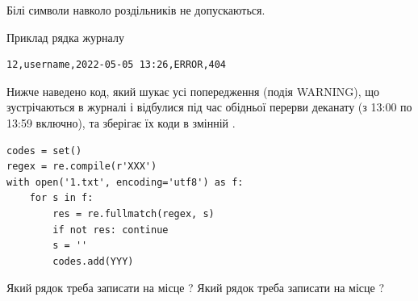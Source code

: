 \documentclass[12pt, ukrainian]{article}
\begin{document}
{Білі символи навколо роздільників не допускаються.

Приклад рядка журналу



\begin{verbatim}
12,username,2022-05-05 13:26,ERROR,404
\end{verbatim}


Нижче наведено код, який шукає усі попередження (подія WARNING), що зустрі\-ча\-ються в журналі і відбулися під час обідньої перерви деканату (з 13:00 по 13:59 включно), та зберігає їх коди в змінній .



\begin{verbatim}
codes = set()
regex = re.compile(r'XXX')
with open('1.txt', encoding='utf8') as f:
    for s in f:
        res = re.fullmatch(regex, s)
        if not res: continue
        s = ''
        codes.add(YYY)
\end{verbatim}





Який рядок треба записати на місце  ?
Який рядок треба записати на місце  ?\par

}
\newpage
\end{document}
